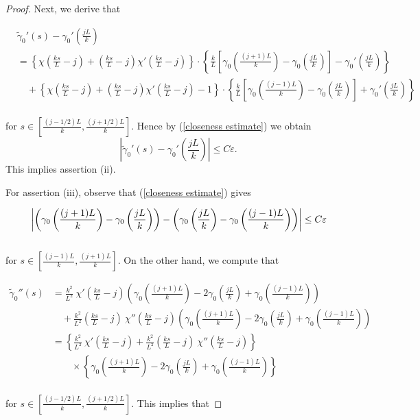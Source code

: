 \documentclass[a4paper, reqno]{amsart}
\theoremstyle{definition}
\theoremstyle{remark}
\numberwithin{equation}{section}
\numberwithin{equation}{section}
\numberwithin{equation}{section}
\begin{document}
\begin{proof}
\bigskip


Next, we derive that 

\begin{align*}
		&\tilde{\gamma}_0'(s)- \gamma_0'\left(\frac{jL}{k}\right) \\
		&= \left\{\chi\left(\frac{ks}{L} - j\right) + \left(\frac{ks}{L} - j\right)\chi'\left(\frac{ks}{L} - j\right)\right\}\cdot \left\{\frac{k}{L}\left[ \gamma_0\left(\frac{(j+1)L}{k}\right) - \gamma_0\left(\frac{jL}{k}\right)\right] - \gamma_0'\left(\frac{jL}{k}\right)\right\}\\
		&\quad +\left\{\chi\left(\frac{ks}{L} - j\right) + \left(\frac{ks}{L} - j\right)\chi'\left(\frac{ks}{L} - j\right) - 1\right\}\cdot \left\{\frac{k}{L}\left[ \gamma_0\left(\frac{(j-1)L}{k}\right) - \gamma_0\left(\frac{jL}{k}\right)\right] + \gamma_0'\left(\frac{jL}{k}\right)\right\}
\end{align*}\\
for $s\in \left[\frac{(j - 1/2)L}{k}, \frac{(j + 1/2)L}{k}\right]$. Hence by (\ref{closeness estimate}) we obtain
\[ \left|\tilde{\gamma}_0'(s)-\gamma_0'\left(\frac{jL}{k}\right)\right| \leq C\varepsilon.\]
This implies assertion (ii).
\bigskip


For assertion (iii), observe that (\ref{closeness estimate}) gives 

\begin{equation}{\label{C^m estimate}}
	 \left|\left(\gamma_0\left(\frac{(j+1)L}{k}\right) - \gamma_0\left(\frac{jL}{k}\right)\right) -  \left(\gamma_0\left(\frac{jL}{k}\right) - \gamma_0\left(\frac{(j-1)L}{k}\right)\right)\right| \leq C\varepsilon
\end{equation}\\
for $s\in \left[\frac{(j - 1)L}{k}, \frac{(j + 1)L}{k}\right]$.
 On the other hand, we compute that

\begin{align*}
	\tilde{\gamma}_0''(s) &= \frac{k^2}{L^2}	\ \chi'\left(\frac{ks}{L} - j\right) \left(\gamma_0\left(\frac{(j+1)L}{k}\right) - 2\gamma_0\left(\frac{jL}{k}\right) + \gamma_0\left(\frac{(j-1)L}{k}\right)\right) \\
	&\quad + \frac{k^2}{L^2}\left( \frac{ks}{L} - j \right)\ \chi''\left(\frac{ks}{L} - j\right) \left(\gamma_0\left(\frac{(j+1)L}{k}\right) - 2\gamma_0\left(\frac{jL}{k}\right) + \gamma_0\left(\frac{(j-1)L}{k}\right)\right)\\
	&= \left\{ \frac{k^2}{L^2}	\ \chi'\left(\frac{ks}{L} - j\right) + \frac{k^2}{L^2}\left( \frac{ks}{L} - j \right)\ \chi''\left(\frac{ks}{L} - j\right)\right\}\\
	&\quad\quad \times \left\{\gamma_0\left(\frac{(j+1)L}{k}\right) - 2\gamma_0\left(\frac{jL}{k}\right) + \gamma_0\left(\frac{(j-1)L}{k}\right)\right\}
\end{align*}\\
for $s\in \left[\frac{(j - 1/2)L}{k}, \frac{(j + 1/2)L}{k}\right]$. This implies that


\end{proof}
\end{document}
